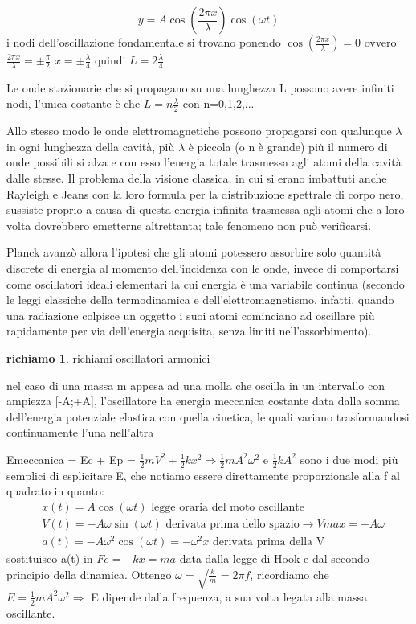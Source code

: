 \documentclass{article}
\theoremstyle{definition}
\newtheorem{richi}{richiamo}[section]
\begin{document}
\begin{equation}
y=A \cos(\frac{2\pi x }{\lambda}) \cos(\omega t)
\end{equation} 
i nodi dell'oscillazione fondamentale si trovano ponendo \(\cos(\frac{2\pi x}{\lambda})=0\)    ovvero    \(\frac{2\pi x}{\lambda } = \pm \frac{\pi }{2}\)      \(x=\pm\frac{\lambda} {4}\)     quindi    \(L=2\frac{\lambda}{4}\)


Le onde stazionarie che si propagano su una lunghezza L possono avere infiniti nodi, l'unica costante è che \(L=n\frac{\lambda }{2}\) con n=0,1,2,...
\par Allo stesso modo le onde elettromagnetiche possono propagarsi con qualunque \(\lambda\) in ogni lunghezza della cavità, più \(\lambda\) è piccola (o n è grande) più il numero di onde possibili si alza e con esso l'energia totale trasmessa agli atomi della cavità dalle stesse. Il problema della visione classica, in cui si erano imbattuti anche Rayleigh e Jeans con la loro formula per la distribuzione spettrale di corpo nero, sussiste proprio a causa di questa energia infinita trasmessa agli atomi che a loro volta dovrebbero emetterne altrettanta; tale fenomeno non può verificarsi.
\par Planck avanzò allora l'ipotesi che gli atomi potessero assorbire solo quantità discrete di energia al momento dell'incidenza con le onde, invece di comportarsi come oscillatori ideali elementari la cui energia è una variabile continua (secondo le leggi classiche della termodinamica e dell'elettromagnetismo, infatti, quando una radiazione colpisce un oggetto i suoi atomi cominciano ad oscillare più rapidamente per via dell'energia acquisita, senza limiti nell'assorbimento).
\begin{richi}{richiami oscillatori armonici}
\par nel caso di una massa m appesa ad una molla che oscilla in un intervallo con ampiezza [-A;+A], l'oscillatore ha energia meccanica costante data dalla somma dell'energia potenziale elastica con quella cinetica, le quali variano trasformandosi continuamente l'una nell'altra
\end{richi}

Emeccanica = Ec + Ep = \(\frac{1}{2} m V^{2} + \frac{1}{2} k x^{2}   \Rightarrow  \frac{1}{2} m A^{2} \omega ^{2}\) e \(\frac{1}{2} k A^{2}\) sono i due modi più semplici di esplicitare E, che notiamo essere direttamente proporzionale alla f al quadrato in quanto:
\begin{align*}
&x(t)=A \cos(\omega t) \text{  legge oraria del moto oscillante}\\ 
&V(t)=-A\omega \sin (\omega t) \text{  derivata prima dello spazio} \rightarrow Vmax=\pm A\omega\\
&a(t)=-A\omega ^{2} \cos(\omega t) = -\omega ^{2} x \text{  derivata prima della V}
\end{align*}
sostituisco a(t) in \(Fe=-kx=ma\) data dalla legge di Hook e dal secondo principio della dinamica. Ottengo \(\omega=\sqrt{\frac{k}{m}}=2\pi f\), ricordiamo che \(E=\frac{1}{2} m A^{2} \omega ^{2}  \Rightarrow \) E dipende dalla frequenza, a sua volta legata alla massa oscillante.\\
\end{document}
